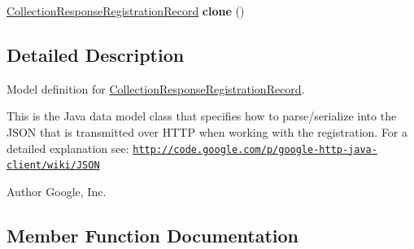 \begin{DoxyCompactItemize}
\item 
\hypertarget{classcom_1_1example_1_1lusifer_1_1myapplication_1_1backend_1_1registration_1_1model_1_1_collection_response_registration_record_a2f79626352ad44bd8e46cd1fe992deb9}{}\hyperlink{classcom_1_1example_1_1lusifer_1_1myapplication_1_1backend_1_1registration_1_1model_1_1_collection_response_registration_record}{Collection\+Response\+Registration\+Record} {\bfseries clone} ()\label{classcom_1_1example_1_1lusifer_1_1myapplication_1_1backend_1_1registration_1_1model_1_1_collection_response_registration_record_a2f79626352ad44bd8e46cd1fe992deb9}

\end{DoxyCompactItemize}


\subsection{Detailed Description}
Model definition for \hyperlink{classcom_1_1example_1_1lusifer_1_1myapplication_1_1backend_1_1registration_1_1model_1_1_collection_response_registration_record}{Collection\+Response\+Registration\+Record}.

This is the Java data model class that specifies how to parse/serialize into the J\+S\+O\+N that is transmitted over H\+T\+T\+P when working with the registration. For a detailed explanation see\+: \href{http://code.google.com/p/google-http-java-client/wiki/JSON}{\tt http\+://code.\+google.\+com/p/google-\/http-\/java-\/client/wiki/\+J\+S\+O\+N} 

\begin{DoxyAuthor}{Author}
Google, Inc. 
\end{DoxyAuthor}


\subsection{Member Function Documentation}
\hypertarget{classcom_1_1example_1_1lusifer_1_1myapplication_1_1backend_1_1registration_1_1model_1_1_collection_response_registration_record_aa9e745b449a55d45f0dab2b977d0783c}{}
